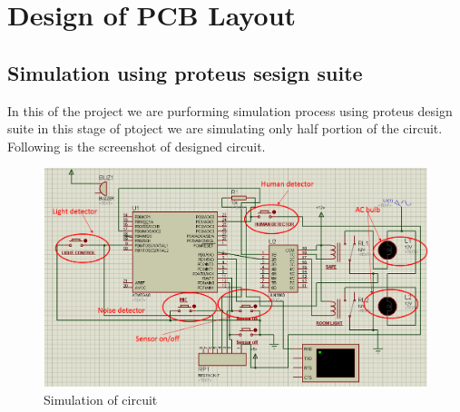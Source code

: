 \documentclass[twoside,a4paper,16pt]{book}
\begin{document}
{{			\chapter{Design of PCB Layout }
			\section{Simulation using proteus sesign suite}
			In this of the project we are purforming simulation process using proteus design suite in this stage of ptoject we are simulating only half portion of the circuit.
			Following is the screenshot of designed circuit.
			\begin{figure}[ht!]
				\begin{center}
					\includegraphics[width=17.0cm]{f4.png}
					\caption{Simulation of circuit}
				\end{center}
			\end{figure}
			\newpage
}}
\end{document}
